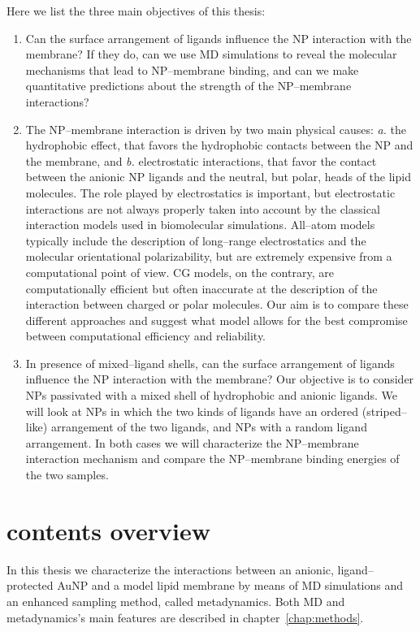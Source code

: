Here we list the three main objectives of this thesis:
\begin{enumerate}[label=\itshape\roman*.]
	\item Can the surface arrangement of ligands influence the \ac{NP} interaction with the membrane? If they do, can we use \ac{MD} simulations to reveal the molecular mechanisms that lead to \ac{NP}--membrane binding, and can we make quantitative predictions about the strength of the \ac{NP}--membrane interactions?%
	\item The \ac{NP}--membrane interaction is driven by two main physical causes: \textit{a.} the hydrophobic effect, that favors the hydrophobic contacts between the \ac{NP} and the membrane, and \textit{b.} electrostatic interactions, that favor the contact between the anionic \ac{NP} ligands and the neutral, but polar, heads of the lipid molecules. The role played by electrostatics is important, but electrostatic interactions are not always properly taken into account by the classical interaction models used in biomolecular simulations. All--atom models typically include the description of long--range electrostatics and the molecular orientational polarizability, but are extremely expensive from a computational point of view. \ac{CG} models, on the contrary, are computationally efficient but often inaccurate at the description of the interaction between charged or polar molecules. Our aim is to compare these different approaches and suggest what model allows for the best compromise between computational efficiency and reliability.%
	\item In presence of mixed--ligand shells, can the surface arrangement of ligands influence the \ac{NP} interaction with the membrane? Our objective is to consider \acp{NP} passivated with a mixed shell of hydrophobic and anionic ligands. We will look at \acp{NP} in which the two kinds of ligands have an ordered (striped--like) arrangement of the two ligands, and \acp{NP} with a random ligand arrangement. In both cases we will characterize the \ac{NP}--membrane interaction mechanism and compare the \ac{NP}--membrane binding energies of the two samples.%
\end{enumerate}

\section{contents overview}
In this thesis we characterize the interactions between an anionic, ligand--protected \ac{AuNP} and a model lipid membrane by means of \ac{MD} simulations and an enhanced sampling method, called metadynamics. Both \ac{MD} and metadynamics's main features are described in chapter~\ref{chap:methods}.


